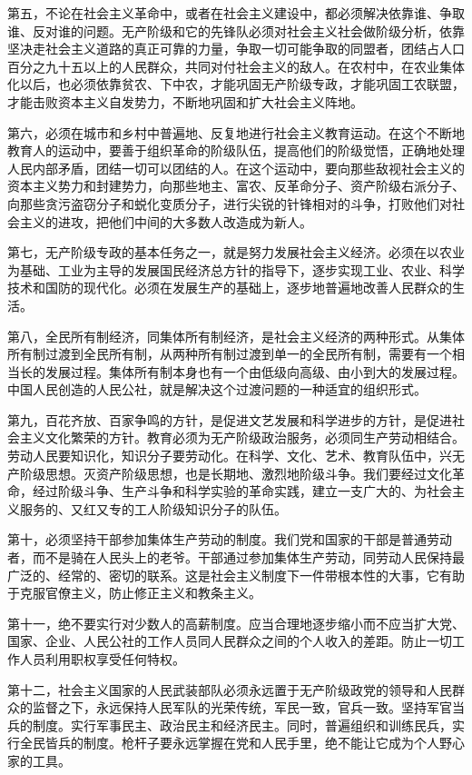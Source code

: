 第五，不论在社会主义革命中，或者在社会主义建设中，都必须解决依靠谁、争取谁、反对谁的问题。无产阶级和它的先锋队必须对社会主义社会做阶级分析，依靠坚决走社会主义道路的真正可靠的力量，争取一切可能争取的同盟者，团结占人口百分之九十五以上的人民群众，共同对付社会主义的敌人。在农村中，在农业集体化以后，也必须依靠贫农、下中农，才能巩固无产阶级专政，才能巩固工农联盟，才能击败资本主义自发势力，不断地巩固和扩大社会主义阵地。

第六，必须在城市和乡村中普遍地、反复地进行社会主义教育运动。在这个不断地教育人的运动中，要善于组织革命的阶级队伍，提高他们的阶级觉悟，正确地处理人民内部矛盾，团结一切可以团结的人。在这个运动中，要向那些敌视社会主义的资本主义势力和封建势力，向那些地主、富农、反革命分子、资产阶级右派分子、向那些贪污盗窃分子和蜕化变质分子，进行尖锐的针锋相对的斗争，打败他们对社会主义的进攻，把他们中间的大多数人改造成为新人。

第七，无产阶级专政的基本任务之一，就是努力发展社会主义经济。必须在以农业为基础、工业为主导的发展国民经济总方针的指导下，逐步实现工业、农业、科学技术和国防的现代化。必须在发展生产的基础上，逐步地普遍地改善人民群众的生活。

第八，全民所有制经济，同集体所有制经济，是社会主义经济的两种形式。从集体所有制过渡到全民所有制，从两种所有制过渡到单一的全民所有制，需要有一个相当长的发展过程。集体所有制本身也有一个由低级向高级、由小到大的发展过程。中国人民创造的人民公社，就是解决这个过渡问题的一种适宜的组织形式。

第九，百花齐放、百家争鸣的方针，是促进文艺发展和科学进步的方针，是促进社会主义文化繁荣的方针。教育必须为无产阶级政治服务，必须同生产劳动相结合。劳动人民要知识化，知识分子要劳动化。在科学、文化、艺术、教育队伍中，兴无产阶级思想。灭资产阶级思想，也是长期地、激烈地阶级斗争。我们要经过文化革命，经过阶级斗争、生产斗争和科学实验的革命实践，建立一支广大的、为社会主义服务的、又红又专的工人阶级知识分子的队伍。

第十，必须坚持干部参加集体生产劳动的制度。我们党和国家的干部是普通劳动者，而不是骑在人民头上的老爷。干部通过参加集体生产劳动，同劳动人民保持最广泛的、经常的、密切的联系。这是社会主义制度下一件带根本性的大事，它有助于克服官僚主义，防止修正主义和教条主义。

第十一，绝不要实行对少数人的高薪制度。应当合理地逐步缩小而不应当扩大党、国家、企业、人民公社的工作人员同人民群众之间的个人收入的差距。防止一切工作人员利用职权享受任何特权。

第十二，社会主义国家的人民武装部队必须永远置于无产阶级政党的领导和人民群众的监督之下，永远保持人民军队的光荣传统，军民一致，官兵一致。坚持军官当兵的制度。实行军事民主、政治民主和经济民主。同时，普遍组织和训练民兵，实行全民皆兵的制度。枪杆子要永远掌握在党和人民手里，绝不能让它成为个人野心家的工具。

